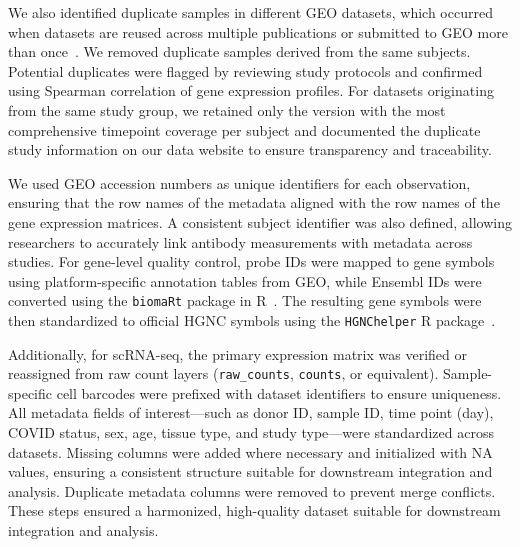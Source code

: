 \documentclass[
  12pt]{article}
\begin{document}
We also identified duplicate samples in different GEO datasets, which occurred when datasets are reused across multiple publications or submitted to GEO more than once~\citep{liu2016individualized,woods2013host,huang2011temporal,zaas2009gene}. We removed duplicate samples derived from the same subjects. Potential duplicates were flagged by reviewing study protocols and confirmed using Spearman correlation of gene expression profiles. For datasets originating from the same study group, we retained only the version with the most comprehensive timepoint coverage per subject and documented the duplicate study information on our data website to ensure transparency and traceability.

We used GEO accession numbers as unique identifiers for each observation, ensuring that the row names of the metadata aligned with the row names of the gene expression matrices. A consistent subject identifier was also defined, allowing researchers to accurately link antibody measurements with metadata across studies. For gene-level quality control, probe IDs were mapped to gene symbols using platform-specific annotation tables from GEO, while Ensembl IDs were converted using the \texttt{biomaRt} package in R~\citep{bruford2020guidelines}. The resulting gene symbols were then standardized to official HGNC symbols using the \texttt{HGNChelper} R package~\citep{oh2022hgnchelper}. 

Additionally, for scRNA-seq, the primary expression matrix was verified or reassigned from raw count layers (\texttt{raw\_counts}, \texttt{counts}, or equivalent). Sample-specific cell barcodes were prefixed with dataset identifiers to ensure uniqueness. All metadata fields of interest—such as donor ID, sample ID, time point (day), COVID status, sex, age, tissue type, and study type—were standardized across datasets. Missing columns were added where necessary and initialized with NA values, ensuring a consistent structure suitable for downstream integration and analysis. Duplicate metadata columns were removed to prevent merge conflicts. These steps ensured a harmonized, high-quality dataset suitable for downstream integration and analysis.
\end{document}
